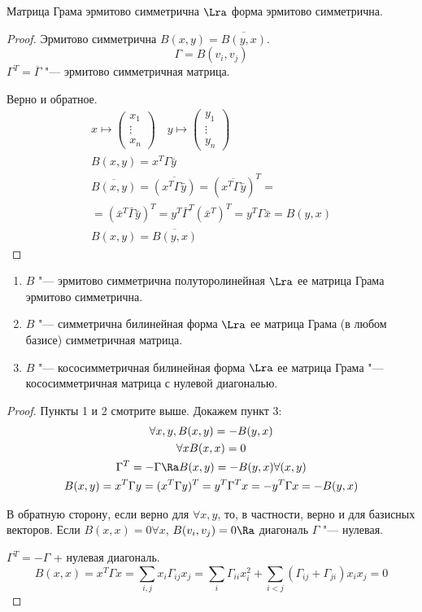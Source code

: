\begin{lemma}
	Матрица Грама эрмитово симметрична $\Lra$ форма эрмитово симметрична.
\end{lemma}
\begin{proof}
	Эрмитово симметрична $B(x, y) = \overline{B(y, x)}$.
	\[ \Gamma = B(v_i, v_j) \]
	$\Gamma^T = \overline{\Gamma}$ "--- эрмитово симметричная матрица.

	Верно и обратное.
	\begin{gather*}
		x \mapsto \begin{pmatrix}
			x_1 \\
			\vdots \\
			x_n
		\end{pmatrix} \quad
		y \mapsto \begin{pmatrix}
			y_1 \\
			\vdots \\
			y_n
		\end{pmatrix} \\
		B(x, y) = x^T\Gamma \bar y \\
		\overline{B(x, y)}
		= \overline{(x^T \Gamma \bar y)}
		= \left( \overline{x^T \Gamma \overline{y}} \right)^T = \\
		= \left( \bar x^T \bar \Gamma \bar y \right)^T
		= y^T \bar \Gamma^T (\bar x^T)^T = y^T \Gamma \bar x
		= B(y, x) \\
		B(x, y) = \overline{B(y, x)}
	\end{gather*}
\end{proof}
\begin{lemma}\hfill
	\begin{enumerate}
		\item $B$ "--- эрмитово симметрична полуторолинейная $\Lra$ ее матрица Грама эрмитово симметрична.
		\item $B$ "--- симметрична билинейная  форма $\Lra$ ее матрица Грама (в любом базисе) симметричная матрица.
		\item $B$ "--- кососимметричная билинейная форма $\Lra$ ее матрица Грама "--- кососимметричная матрица с нулевой диагональю.
	\end{enumerate}
\end{lemma}
\begin{proof}
	Пункты 1 и 2 смотрите выше.
	Докажем пункт 3:
	\begin{gather*}
		\forall x,y, B(x, y) = -B(y,x) \\
		\forall x B(x, x) = 0 \\
		\Gamma^T = -\Gamma \Ra B(x, y) = -B(y, x) \forall (x, y) \\
		B(x, y) = x^T \Gamma y = (x^T \Gamma y)^T = y^T\Gamma^T x = -y^T\Gamma x = -B(y, x)
	\end{gather*}

	В обратную сторону, если верно для $\forall x,y$,
	то, в частности, верно и для базисных векторов.
	Если $B(x, x) = 0 \forall x$, $B(v_i, v_j) = 0 \Ra$ диагональ $\Gamma$ "--- нулевая.

	$\Gamma^{T} = -\Gamma $ + нулевая диагональ.
	\[
		B(x, x)
		= x^T \Gamma x
		= \sum_{i, j} x_i\Gamma_{ij}x_j
		= \sum_i\Gamma_{ii}x_i^2 + \sum_{i<j} (\Gamma_{ij}+ \Gamma_{ji})x_ix_j = 0
	\]
\end{proof}

